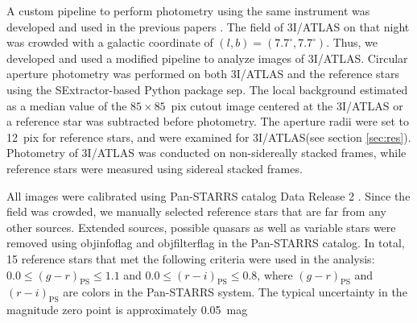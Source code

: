 \documentclass[]{pasj02}
\newcommand\I{3I/ATLAS\xspace}
\begin{document}
A custom pipeline to perform photometry using the same instrument was developed and used in the previous papers \citep{Beniyama2023a, Beniyama2023b, Beniyama2023c, Beniyama2024, Beniyama2025b}.
The field of \I on that night was crowded with a galactic coordinate of $(l, b) = (7.7^{\circ}, 7.7^{\circ})$.
Thus, we developed and used a modified pipeline to analyze images of \I.
Circular aperture photometry was performed on both \I and the reference stars using the SExtractor-based Python package sep. 
The local background estimated as a median value of the $85\times85$~pix cutout image centered at the \I or a reference star was subtracted before photometry.
The aperture radii were set to 12~pix for reference stars, and were examined for \I (see section \ref{sec:res}).
Photometry of \I was conducted on non-sidereally stacked frames, while reference stars were measured using sidereal stacked frames.

All images were calibrated using Pan-STARRS catalog Data Release 2 \citep{Chambers2016}.
Since the field was crowded, we manually selected reference stars that are far from any other sources.
Extended sources, possible quasars as well as variable stars were removed using objinfoflag and objfilterflag in the Pan-STARRS catalog.
In total, 15 reference stars that met the following criteria were used in the analysis:
$0.0 \leq (g-r)_{\mathrm{PS}} \leq 1.1$ and $0.0 \leq (r-i)_{\mathrm{PS}} \leq 0.8$, where $(g-r)_{\mathrm{PS}}$ and $(r-i)_{\mathrm{PS}}$ are colors in the Pan-STARRS system.
The typical uncertainty in the magnitude zero point is approximately 0.05~mag
\end{document}
